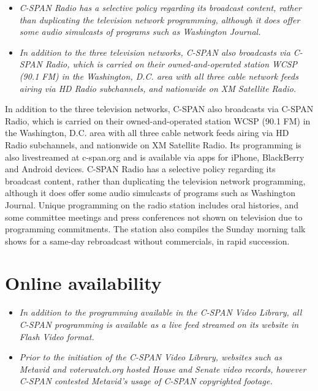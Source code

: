 \begin{itemize}
\item
  \emph{C-SPAN Radio has a selective policy regarding its broadcast
  content, rather than duplicating the television network programming,
  although it does offer some audio simulcasts of programs such as
  Washington Journal.}
\item
  \emph{In addition to the three television networks, C-SPAN also
  broadcasts via C-SPAN Radio, which is carried on their
  owned-and-operated station WCSP (90.1 FM) in the Washington, D.C. area
  with all three cable network feeds airing via HD Radio subchannels,
  and nationwide on XM Satellite Radio.}
\end{itemize}

In addition to the three television networks, C-SPAN also broadcasts via
C-SPAN Radio, which is carried on their owned-and-operated station WCSP
(90.1 FM) in the Washington, D.C. area with all three cable network
feeds airing via HD Radio subchannels, and nationwide on XM Satellite
Radio. Its programming is also livestreamed at c-span.org and is
available via apps for iPhone, BlackBerry and Android devices. C-SPAN
Radio has a selective policy regarding its broadcast content, rather
than duplicating the television network programming, although it does
offer some audio simulcasts of programs such as Washington Journal.
Unique programming on the radio station includes oral histories, and
some committee meetings and press conferences not shown on television
due to programming commitments. The station also compiles the Sunday
morning talk shows for a same-day rebroadcast without commercials, in
rapid succession.

\section{Online availability}\label{online-availability}

\begin{itemize}
\item
  \emph{In addition to the programming available in the C-SPAN Video
  Library, all C-SPAN programming is available as a live feed streamed
  on its website in Flash Video format.}
\item
  \emph{Prior to the initiation of the C-SPAN Video Library, websites
  such as Metavid and voterwatch.org hosted House and Senate video
  records, however C-SPAN contested Metavid's usage of C-SPAN
  copyrighted footage.}
\end{itemize}

